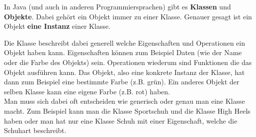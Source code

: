 


\begin{Infobox}
    In Java (und auch in anderen Programmiersprachen) gibt es \textbf{Klassen} und \textbf{Objekte}.
    Dabei gehört ein Objekt immer zu einer Klasse. Genauer gesagt ist ein Objekt \textbf{eine Instanz} einer Klasse.

    Die Klasse beschreibt dabei generell welche Eigenschaften und Operationen ein Objekt haben kann.
    Eigenschaften können zum Beispiel Daten (wie der Name oder die Farbe des Objekts) sein.
    Operationen wiederum sind Funktionen die das Objekt ausführen kann.
    Das Objekt, also eine konkrete Instanz der Klasse, hat dann zum Beispiel eine bestimmte Farbe (z.B. grün).
    Ein anderes Objekt der selben Klasse kann eine eigene Farbe (z.B. rot) haben.\\

    Man muss sich dabei oft entscheiden wie generisch oder genau man eine Klasse macht. Zum Beispiel kann man die Klasse Sportschuh und die Klasse High Heels haben oder man hat nur eine Klasse Schuh mit einer Eigenschaft, welche die Schuhart beschreibt.
\end{Infobox}

